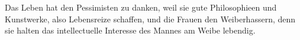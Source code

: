 Das Leben hat den Pessimisten zu danken, weil sie gute Philosophieen und Kunstwerke, also Lebensreize schaffen, und die Frauen den Weiberhassern, denn sie halten das intellectuelle Interesse des Mannes am Weibe lebendig.
\par

